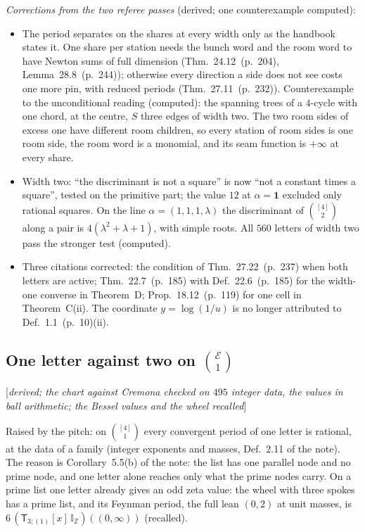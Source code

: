 \documentclass[11pt]{article}
\newcommand{\cE}{\mathcal E}
\newcommand{\one}{\mathbf 1}
\newcommand{\sT}{\mathsf T}
\newcommand{\IZ}{\mathbb I_{\mathbb Z}}
\newcommand{\Tx}[3]{(\sT_{#1;(1)}[x]\,#2)((#3,\infty))}
\newcommand{\status}[1]{\hfill{\small[\textit{#1}]}}
\newcommand{\hb}[2]{#1~(p.~#2)}   %
\theoremstyle{plain}
\theoremstyle{remark}
\begin{document}
\emph{Corrections from the two referee passes} (derived; one counterexample computed):
\begin{itemize}
\item The period separates on the shares at every width only as the handbook states it. One share per station needs the bunch word and the room word to have Newton sums of full dimension (Thm.~\hb{24.12}{204}, Lemma~\hb{28.8}{244}); otherwise every direction a side does not see costs one more pin, with reduced periods (Thm.~\hb{27.11}{232}). Counterexample to the unconditional reading (computed): the spanning trees of a $4$-cycle with one chord, at the centre, $S$ three edges of width two. The two room sides of excess one have different room children, so every station of room sides is one room side, the room word is a monomial, and its seam function is $+\infty$ at every share.
\item Width two: ``the discriminant is not a square'' is now ``not a constant times a square'', tested on the primitive part; the value $12$ at $\alpha=\one$ excluded only rational squares. On the line $\alpha=(1,1,1,\lambda)$ the discriminant of $\binom{[4]}2$ along a pair is $4(\lambda^2+\lambda+1)$, with simple roots. All $560$ letters of width two pass the stronger test (computed).
\item Three citations corrected: the condition of Thm.~\hb{27.22}{237} when both letters are active; Thm.~\hb{22.7}{185} with Def.~\hb{22.6}{185} for the width-one converse in Theorem~D; Prop.~\hb{18.12}{119} for one cell in Theorem~C(ii). The coordinate $y=\log(1/u)$ is no longer attributed to Def.~\hb{1.1}{10}(ii).
\end{itemize}

\subsection{One letter against two on $\binom{\cE}1$}\status{derived; the chart against Cremona checked on $495$ integer data, the values in ball arithmetic; the Bessel values and the wheel recalled}

Raised by the pitch: on $\binom{[4]}1$ every convergent period of one letter is rational, at the data of a family (integer exponents and masses, Def.~2.11 of the note). The reason is Corollary~5.5(b) of the note: the list has one parallel node and no prime node, and one letter alone reaches only what the prime nodes carry. On a prime list one letter already gives an odd zeta value: the wheel with three spokes has a prime list, and its Feynman period, the full lean $(0,2)$ at unit masses, is $6\,\Tx3\IZ0$ (recalled).
\end{document}
